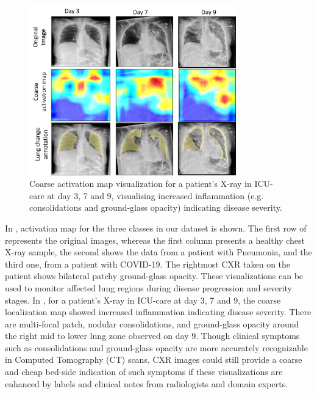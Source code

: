 \begin{figure}[h!]
\centering
\includegraphics[width=0.8\textwidth]{images/Picture2_activation map.png}
   \caption{Coarse activation map visualization for a patient's X-ray in ICU-care at day 3, 7 and 9, visualising increased inflammation (e.g. consolidations and ground-glass opacity) indicating disease severity.}
\label{fig:activation_map}
\end{figure}
 
 In , activation map for the three classes in our dataset is shown.  The first row of   represents the original images, whereas the first column presents a healthy chest X-ray sample, the second shows the data from a patient with Pneumonia, and the third one, from a patient with COVID-19. The rightmost CXR taken on the patient shows bilateral patchy ground-glass opacity. These visualizations can be used to monitor affected lung regions during disease progression and severity stages. In , for a patient's X-ray in ICU-care at day 3, 7 and 9, the coarse localization map showed increased inflammation indicating disease severity. There are multi-focal patch, nodular consolidations, and ground-glass opacity around the right mid to lower lung zone observed on day 9.
 Though clinical symptoms such as consolidations and ground-glass opacity \cite{li2020ct} are more accurately recognizable in Computed Tomography (CT) scans, CXR images could still provide a coarse and cheap bed-side indication of such symptoms if these visualizations are enhanced by labels and clinical notes from radiologists and domain experts.


